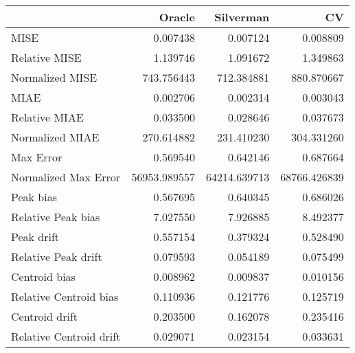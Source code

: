 \begin{tabular}{lrrr}
  \hline
 & Oracle & Silverman & CV \\ 
  \hline
MISE & 0.007438 & 0.007124 & 0.008809 \\ 
  Relative MISE & 1.139746 & 1.091672 & 1.349863 \\ 
  Normalized MISE & 743.756443 & 712.384881 & 880.870667 \\ 
  MIAE & 0.002706 & 0.002314 & 0.003043 \\ 
  Relative MIAE & 0.033500 & 0.028646 & 0.037673 \\ 
  Normalized MIAE & 270.614882 & 231.410230 & 304.331260 \\ 
  Max Error & 0.569540 & 0.642146 & 0.687664 \\ 
  Normalized Max Error & 56953.989557 & 64214.639713 & 68766.426839 \\ 
  Peak bias & 0.567695 & 0.640345 & 0.686026 \\ 
  Relative Peak bias & 7.027550 & 7.926885 & 8.492377 \\ 
  Peak drift & 0.557154 & 0.379324 & 0.528490 \\ 
  Relative Peak drift & 0.079593 & 0.054189 & 0.075499 \\ 
  Centroid bias & 0.008962 & 0.009837 & 0.010156 \\ 
  Relative Centroid bias & 0.110936 & 0.121776 & 0.125719 \\ 
  Centroid drift & 0.203500 & 0.162078 & 0.235416 \\ 
  Relative Centroid drift & 0.029071 & 0.023154 & 0.033631 \\ 
   \hline
\end{tabular}
